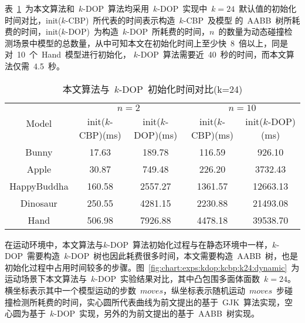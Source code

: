 表~\ref{tab:exper:kcbp:kdop:init:k24}~为本文算法和~$k$-DOP~算法均采用~$k$-DOP~实现中~$k=24$~默认值的初始化时间对比，init($k$-CBP)~所代表的时间表示构造~$k$-CBP~及模型
的~AABB~树所耗费的时间，init($k$-DOP)~为构造~$k$-DOP~所耗费的时间，$n$~的数量为动态碰撞检测场景中模型的总数量，从中可知本文在初始化时间上至少快~8~倍以上，同是对~10~个~Hand~模型进行初始化，
$k$-DOP~算法需要近~40~秒的时间，而本文算法仅需~4.5~秒。

\begin{table}[htb]
\centering
\caption{本文算法与~$k$-DOP~初始化时间对比(k=24)}
\label{tab:exper:kcbp:kdop:init:k24}
\begin{tabular}{ccccc}
\toprule[1.5pt]
\multirow{2}{*}{Model} & \multicolumn{2}{c}{$n=2$} &
\multicolumn{2}{c}{$n=10$}\\
\cmidrule(lr){2-3}\cmidrule(lr){4-5}
~&init($k$-CBP)(ms)&init($k$-DOP)(ms)& init($k$-CBP)(ms)&init($k$-DOP)(ms) \\
\midrule[1pt]
Bunny    &17.63  &189.78   &116.59 	  &926.10   	 \\
Apple    &30.87  &749.48   &226.20 	  &3732.43  	 \\
HappyBuddha	&160.58 	&2557.27 	&1361.57 	&12663.13  \\
Dinosaur &250.55 &4281.15  &2230.88	  &21493.08 	 \\
Hand	&506.98 &	7926.88 &	4478.18 &	39538.70 \\ 
\bottomrule[1.5pt]
\end{tabular}
\end{table}

在运动环境中，本文算法与$k$-DOP~算法初始化过程与在静态环境中一样，$k$-DOP~需要构造~$k$-DOP~树也因此耗费很多时间，本文需要构造~AABB~树，也是初始化过程中占用时间较多的步骤。图~\ref{fig:chart:exps:kdop:kcbp:k24:dynamic}~为运动场景下本文算法与~$k$-DOP~实验结果对比，其中凸包围多面体面数~$k=24$。
横坐标表示其中一个模型运动的步数~$moves$，纵坐标表示随机运动~$moves$~步碰撞检测所耗费的时间，实心圆所代表曲线为前文提出的基于~GJK~算法实现，空心圆为基于~$k$-DOP~实现，另外的为前文提出的基于~AABB~树实现。

